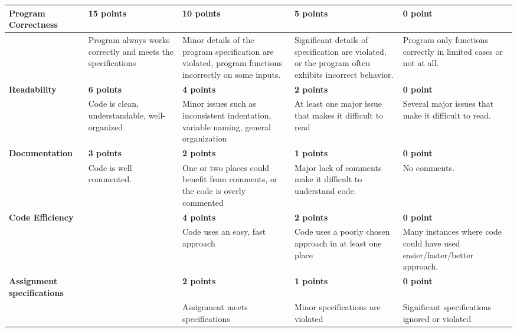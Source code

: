 \documentclass[11pt,landscape]{article}
\begin{document}
{\renewcommand{\arraystretch}{2}
\begin{tabular}{|p{3.3cm}|p{4.2cm}|p{4.2cm}|p{4.2cm}|p{4.2cm}|}
\hline
{\bf Program \newline Correctness } & {\bf 15 points} & {\bf 10 points} & {\bf 5 points} & {\bf 0 point} \\
\hline
& 
 Program always works correctly and meets the specifications& 
 Minor details of the program specification are violated, program functions incorrectly on some inputs.& 
 Significant details of specification are violated, or the program often exhibits incorrect behavior.& 
 Program only functions correctly in limited cases or not at all.\\
\hline
{\bf Readability } & {\bf 6 points} & {\bf 4 points} & {\bf 2 points} & {\bf 0 point} \\
\hline
& 
Code is clean, understandable, well-organized &
Minor issues such as inconsistent indentation, variable naming, general organization & 
At least one major issue that makes it difficult to read & 
Several major issues that make it difficult to read.\\
\hline
{\bf Documentation} & {\bf 3 points}& {\bf 2 points} & {\bf 1 points} & {\bf 0 point} \\
\hline
 &
Code is well commented. 
&
One or two places could benefit from comments, or the code is overly commented
&
Major lack of comments make it difficult to understand code.
&
No comments.\\
\hline
{\bf Code Efficiency } & & {\bf 4 points} & {\bf 2 points} & {\bf 0 point} \\
\hline
& &
Code uses an easy, fast approach &
Code uses a poorly chosen approach in at least one place & 
Many instances where code could have used easier/faster/better approach.\\
\hline
{\bf Assignment specifications} & & {\bf 2 points} & {\bf 1 points} & {\bf 0 point} \\
\hline
 & &
Assignment meets specifications
&
Minor specifications are violated
&
Significant specifications ignored or violated
\\
\hline
 \end{tabular}
}
\end{document}
